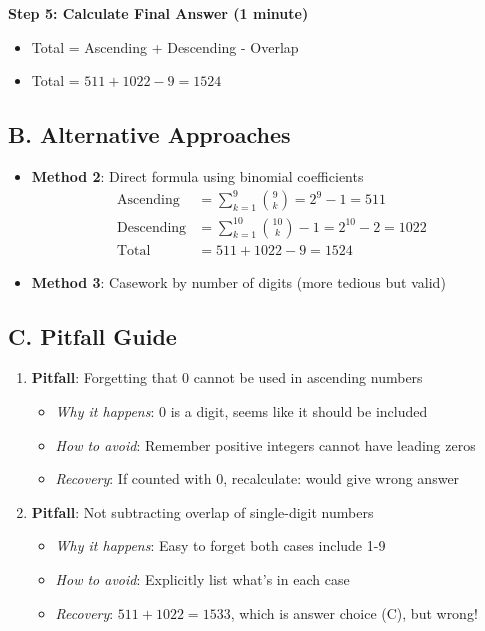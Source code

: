 \documentclass[]{article}
\begin{document}
\begin{solutionbox}
\textbf{Step 5: Calculate Final Answer (1 minute)}
\begin{itemize}
    \item Total = Ascending + Descending - Overlap
    \item Total = $511 + 1022 - 9 = 1524$
\end{itemize}

\subsection*{B. Alternative Approaches}
\begin{itemize}[leftmargin=*]
    \item \textbf{Method 2}: Direct formula using binomial coefficients
    \begin{align*}
    \text{Ascending} &= \sum_{k=1}^{9} \binom{9}{k} = 2^9 - 1 = 511\\
    \text{Descending} &= \sum_{k=1}^{10} \binom{10}{k} - 1 = 2^{10} - 2 = 1022\\
    \text{Total} &= 511 + 1022 - 9 = 1524
    \end{align*}
    
    \item \textbf{Method 3}: Casework by number of digits (more tedious but valid)
\end{itemize}

\subsection*{C. Pitfall Guide}
\begin{enumerate}
    \item \textbf{Pitfall}: Forgetting that 0 cannot be used in ascending numbers
    \begin{itemize}
        \item \textit{Why it happens}: 0 is a digit, seems like it should be included
        \item \textit{How to avoid}: Remember positive integers cannot have leading zeros
        \item \textit{Recovery}: If counted with 0, recalculate: would give wrong answer
    \end{itemize}
    
    \item \textbf{Pitfall}: Not subtracting overlap of single-digit numbers
    \begin{itemize}
        \item \textit{Why it happens}: Easy to forget both cases include 1-9
        \item \textit{How to avoid}: Explicitly list what's in each case
        \item \textit{Recovery}: $511 + 1022 = 1533$, which is answer choice (C), but wrong!
    \end{itemize}
    

\end{enumerate}
\end{solutionbox}
\end{document}
